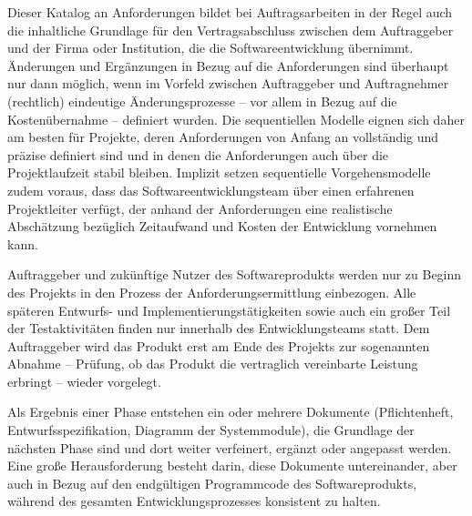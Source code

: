 Dieser Katalog an Anforderungen bildet bei Auftragsarbeiten in der Regel auch die inhaltliche Grundlage für den Vertragsabschluss zwischen dem Auftraggeber und der Firma oder Institution, die die Softwareentwicklung übernimmt. Änderungen und Ergänzungen in Bezug auf die Anforderungen sind überhaupt nur dann möglich, wenn im Vorfeld zwischen Auftraggeber und Auftragnehmer (rechtlich) eindeutige Änderungsprozesse – vor allem in Bezug auf die Kostenübernahme – definiert wurden. Die sequentiellen Modelle eignen sich daher am besten für Projekte, deren Anforderungen von Anfang an vollständig und präzise definiert sind und in denen die Anforderungen auch über die Projektlaufzeit stabil bleiben. Implizit setzen sequentielle Vorgehensmodelle zudem voraus, dass das Softwareentwicklungsteam über einen erfahrenen Projektleiter verfügt, der anhand der Anforderungen eine realistische Abschätzung bezüglich Zeitaufwand und Kosten der Entwicklung vornehmen kann.


Auftraggeber und zukünftige Nutzer des Softwareprodukts werden nur zu Beginn des Projekts in den Prozess der Anforderungsermittlung einbezogen. Alle späteren Entwurfs- und Implementierungstätigkeiten sowie auch ein großer Teil der Test\-akti\-vitäten finden nur innerhalb des Entwicklungsteams statt. Dem Auftraggeber wird das Produkt erst am Ende des Projekts zur sogenannten Abnahme – Prüfung, ob das Produkt die vertraglich vereinbarte Leistung erbringt – wieder vorgelegt.

Als Ergebnis einer Phase entstehen ein oder mehrere Dokumente (\zb Pflichtenheft, Entwurfs\-spezifikation, Diagramm der Systemmodule), die Grundlage der nächsten Phase sind und dort weiter verfeinert, ergänzt oder angepasst werden. Eine große Heraus\-forderung besteht darin, diese Dokumente untereinander, aber auch in Bezug auf den endgültigen Programmcode des Softwareprodukts, während des gesamten Entwicklungsprozesses konsistent zu halten.

